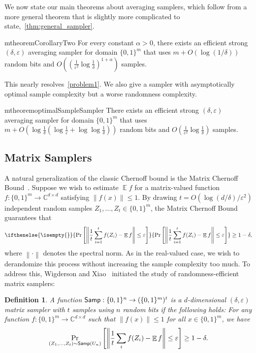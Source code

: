 \documentclass[11pt,letterpaper]{article}
\newtheorem{definition}[theorem]{Definition}
\newcommand{\C}{\mathbb{C}}
\DeclareMathOperator*{\E}{\mathbb{E}}
\newcommand{\eps}{\varepsilon}
\newcommand{\1}{\mathbbm{1}}
\newcommand{\norm}[1]{\left\lVert #1\right\rVert}
\newcommand{\zo}{\{0, 1\}}
\newcommand{\Smp}{\textup{\textsf{Samp}}}
\newcommand{\Prb}[2][]{ \ifthenelse{\isempty{#1}}
  {\Pr\left[#2\right]}
  {\Pr_{#1}\left[#2\right]} }
\begin{document}
We now state our main theorems about averaging samplers, which follow from a more general theorem that is slightly more complicated to state,~\cref{thm:general_sampler}.

\begin{restatable}{mtheorem}{CorollaryTwo}
    \label{cor:domain_sampler}
     For every constant $\alpha > 0$, there exists an efficient strong $(\delta, \eps)$ averaging sampler for domain $\zo^m$ that uses  $m + O(\log(1/\delta))$ random bits and  $O((\frac{1}{\eps^{2}} \log \frac{1}{\delta})^{1 + \alpha})$ samples.
\end{restatable}

This nearly resolves~\cref{problem1}. We also give a sampler with asymptotically optimal sample complexity but a worse randomness complexity.


\begin{restatable}{mtheorem}{optimalSampleSampler}
    \label{lem:optimal_sample_sampler}
    There exists an efficient strong $(\delta, \eps)$ averaging sampler for domain $\zo^m$ that uses $m + O(\log\frac{1}{\delta} (\log \frac{1}{\eps} + \log\log\frac{1}{\delta} ))$ random bits and $O(\frac{1}{\eps^{2}} \log \frac{1}{\delta})$ samples. 
\end{restatable}


\subsection{Matrix Samplers}
A natural generalization of the classic Chernoff bound is the Matrix Chernoff Bound~\cite{Rud99, AW02, Tro12}. Suppose we wish to estimate $\E f$ for a matrix-valued function $f: \zo^m \to \C^{d \times d}$ satisfying $\norm{f(x)} \le 1$.
By drawing $t = O(\log(d/\delta)/\eps^2)$ independent random samples $Z_1, \dots, Z_t \in \zo^m$, the
Matrix Chernoff Bound guarantees that \[
    \Prb{\norm{\frac{1}{t} \sum_{i=1}^t f(Z_i) - \E f} \le \eps} \ge 1 - \delta,
\]
where $\norm{\cdot}$ denotes the spectral norm.
As in the real-valued case, we wish to derandomize this process without increasing the sample complexity too much. 
To address this, Wigderson and Xiao~\cite{WX05} initiated the study of randomness-efficient matrix samplers:
\begin{definition}
    A function $\Smp : \zo^n \to (\zo^m)^t$ is a $d$-dimensional $(\delta, \eps)$ matrix sampler with $t$ samples using $n$ random bits if the following holds: For any function $f : \zo^m \to \C^{d \times d}$ such that $\|f(x)\| \leq 1$ for all $x \in \zo^m$, we have
    \[
    \Pr_{(Z_1, \dots, Z_t) \sim \Smp(U_n)}
    \left[ \norm{\frac{1}{t}  \sum_i f(Z_i) - \E f} \leq \varepsilon \right]
    \geq 1 - \delta.
    \]
\end{definition}
\end{document}
